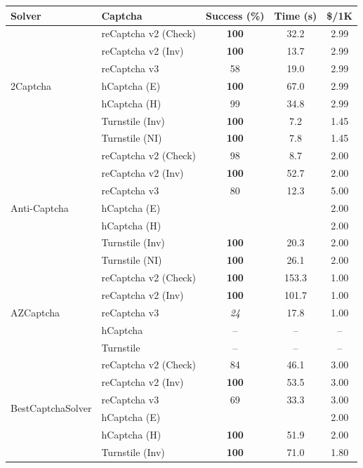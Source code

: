 \begin{table}[t!]
\centering
\scriptsize
\setlength{\tabcolsep}{3pt} %
\renewcommand{\arraystretch}{1.15}
\begin{tabular}{l l c c c}
\toprule
\textbf{Solver} & \textbf{Captcha} & \textbf{Success (\%)} & \textbf{Time (s)} & \textbf{\$/1K} \\
\midrule
\multirow{7}{*}{2Captcha} & reCaptcha v2 (Check) & \textbf{100} & 32.2 & 2.99 \\
 & reCaptcha v2 (Inv) & \textbf{100} & 13.7 & 2.99 \\
 & reCaptcha v3 & 58 & 19.0 & 2.99 \\
 & hCaptcha (E) & \textbf{100} & 67.0 & 2.99 \\
 & hCaptcha (H) & 99 & 34.8 & 2.99 \\
 & Turnstile (Inv) & \textbf{100} & 7.2 & 1.45 \\
 & Turnstile (NI) & \textbf{100} & 7.8 & 1.45 \\
\midrule
\multirow{7}{*}{Anti-Captcha} & reCaptcha v2 (Check) & 98 & 8.7 & 2.00 \\
 & reCaptcha v2 (Inv) & \textbf{100} & 52.7 & 2.00 \\
 & reCaptcha v3 & 80 & 12.3 & 5.00 \\
 & hCaptcha (E) & \ph{} & \ph{} & 2.00 \\
 & hCaptcha (H) & \ph{} & \ph{} & 2.00 \\
 & Turnstile (Inv) & \textbf{100} & 20.3 & 2.00 \\
 & Turnstile (NI) & \textbf{100} & 26.1 & 2.00 \\
\midrule
\multirow{5}{*}{AZCaptcha} & reCaptcha v2 (Check) & \textbf{100} & 153.3 & 1.00 \\
 & reCaptcha v2 (Inv) & \textbf{100} & 101.7 & 1.00 \\
 & reCaptcha v3 & \textit{24} & 17.8 & 1.00 \\
 & hCaptcha & -- & -- & -- \\
 & Turnstile & -- & -- & -- \\
\midrule
\multirow{7}{*}{BestCaptchaSolver} & reCaptcha v2 (Check) & 84 & 46.1 & 3.00 \\
 & reCaptcha v2 (Inv) & \textbf{100} & 53.5 & 3.00 \\
 & reCaptcha v3 & 69 & 33.3 & 3.00 \\
 & hCaptcha (E) & \ph{} & \ph{} & 2.00 \\
 & hCaptcha (H) & \textbf{100} & 51.9 & 2.00 \\
 & Turnstile (Inv) & \textbf{100} & 71.0 & 1.80 \\

\end{tabular}
\end{table}
